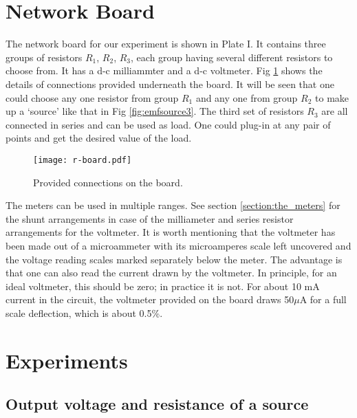 \documentclass[12pt]{book}
\begin{document}
\section{Network Board}
The network board for our experiment is shown in Plate I. It contains three groups of resistors $R_1$, $R_2$, $R_3$, each group having several different resistors to choose from. It has a d-c milliammter and a d-c voltmeter. Fig \ref{fig:netboard} shows the details of connections provided underneath the board. It will be seen that one could choose any one resistor from group $R_1$ and any one from group $R_2$ to make up a `source' like that in Fig \ref{fig:emfsource3}. The third set of resistors $R_3$ are all connected in series and can be used as load. One could plug-in at any pair of points and get the desired value of the load.
\begin{figure}
    \centering
    \texttt{[image: r-board.pdf]}
    \caption{Provided connections on the board.}
    \label{fig:netboard}
\end{figure}

The meters can be used in multiple ranges. See section \ref{section:the_meters} for the shunt arrangements in case of the milliameter and series resistor arrangements for the voltmeter. It is worth mentioning that the voltmeter has been made out of a microammeter with its microamperes scale left uncovered and the voltage reading scales marked separately below the meter. The advantage is that one can also read the current drawn by the voltmeter. In principle, for an ideal voltmeter, this should be zero; in practice it is not. For about 10 mA current in the circuit, the voltmeter provided on the board draws 50$\mu$A for a full scale deflection, which is about 0.5\%.

\section{Experiments}
\subsection{Output voltage and resistance of a source}
\label{section:vo-vs-r}
\end{document}
